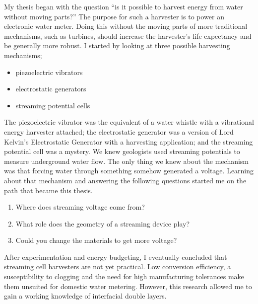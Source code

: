   My thesis began with the question ``is it possible to harvest energy from water without moving parts?''
  The purpose for such a harvester is to power an electronic water meter.
  Doing this without the moving parts of more traditional mechanisms, such as turbines, should increase the harvester's life expectancy and be generally more robust.
  I started by looking at three possible harvesting mechanisms;
  \begin{itemize}
    \item piezoelectric vibrators
    \item electrostatic generators
    \item streaming potential cells
  \end{itemize}
  The piezoelectric vibrator was the equivalent of a water whistle with a vibrational energy harvester attached; the electrostatic generator was a version of Lord Kelvin's Electrostatic Generator with a harvesting application; and the streaming potential cell was a mystery.
  We knew geologists used streaming potentials to measure underground water flow.
  The only thing we knew about the mechanism was that forcing water through something somehow generated a voltage.
  Learning about that mechanism and answering the following questions started me on the path that became this thesis.
  \begin{enumerate}
    \item Where does streaming voltage come from?
    \item What role does the geometry of a streaming device play?
    \item Could you change the materials to get more voltage?
  \end{enumerate}
  After experimentation and energy budgeting, I eventually concluded that streaming cell harvesters are not yet practical.
  Low conversion efficiency, a susceptibility to clogging and the need for high manufacturing tolerances make them unsuited for domestic water metering.
  However, this research allowed me to gain  a working knowledge of interfacial double layers.

